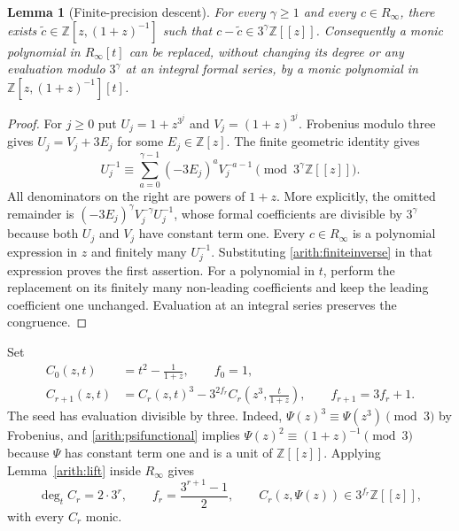 \documentclass[11pt,a4paper]{article}
\newtheorem{lemma}{Lemma}[section]
\theoremstyle{definition}
\theoremstyle{remark}\newtheorem{remark}[lemma]{Remark}
\begin{document}
\begin{lemma}[Finite-precision descent]\label{arith:descent}
For every $\gamma\geq1$ and every $c\in R_\infty$, there exists
$\widetilde c\in\mathbb Z[z,(1+z)^{-1}]$ such that
$c-\widetilde c\in3^\gamma\mathbb Z[[z]]$.
Consequently a monic polynomial in $R_\infty[t]$ can be replaced, without
changing its degree or any evaluation modulo $3^\gamma$ at an integral
formal series, by a monic polynomial in
$\mathbb Z[z,(1+z)^{-1}][t]$.
\end{lemma}
\begin{proof}
For $j\geq0$ put $U_j=1+z^{3^j}$ and $V_j=(1+z)^{3^j}$.
Frobenius modulo three gives $U_j=V_j+3E_j$ for some $E_j\in\mathbb Z[z]$.
The finite geometric identity gives
\begin{equation}\label{arith:finiteinverse}
 U_j^{-1}\equiv
 \sum_{a=0}^{\gamma-1}(-3E_j)^aV_j^{-a-1}
 \pmod{3^\gamma\mathbb Z[[z]]}.
\end{equation}
All denominators on the right are powers of $1+z$. More explicitly,
the omitted remainder is $(-3E_j)^\gamma V_j^{-\gamma}U_j^{-1}$,
whose formal coefficients are divisible by $3^\gamma$ because both
$U_j$ and $V_j$ have constant term one.
Every $c\in R_\infty$ is a polynomial expression in $z$ and finitely many
$U_j^{-1}$. Substituting \eqref{arith:finiteinverse} in that expression
proves the first assertion. For a polynomial in $t$, perform the
replacement on its finitely many non-leading coefficients and keep the
leading coefficient one unchanged. Evaluation at an integral series
preserves the congruence.
\end{proof}

Set
\begin{equation}\label{arith:Cr}
 \begin{split}
 C_0(z,t)&=t^2-\frac1{1+z},\qquad f_0=1,\\
 C_{r+1}(z,t)&=C_r(z,t)^3-
       3^{2f_r}C_r\left(z^3,\frac{t}{1+z}\right),
       \qquad f_{r+1}=3f_r+1.
 \end{split}
\end{equation}
The seed has evaluation divisible by three. Indeed,
$\Psi(z)^3\equiv\Psi(z^3)\pmod3$ by Frobenius, and
\eqref{arith:psifunctional} implies
$\Psi(z)^2\equiv(1+z)^{-1}\pmod3$ because $\Psi$ has constant term one
and is a unit of $\mathbb Z[[z]]$.
Applying Lemma~\ref{arith:lift} inside $R_\infty$ gives
\begin{equation}\label{arith:Cproperties}
 \deg_t C_r=2\cdot3^r,\qquad
 f_r=\frac{3^{r+1}-1}{2},\qquad
 C_r(z,\Psi(z))\in3^{f_r}\mathbb Z[[z]],
\end{equation}
with every $C_r$ monic.
\end{document}

